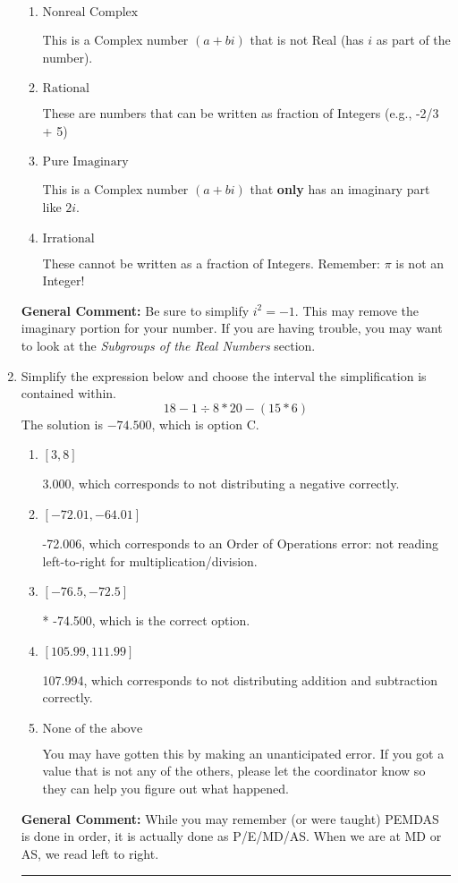 \documentclass{extbook}[14pt]
\newcommand{\litem}[1]{\item #1

\rule{\textwidth}{0.4pt}}
\begin{document}
\begin{enumerate}
{\begin{enumerate}[label=\Alph*.]
* This is the correct option!
\item \( \text{Nonreal Complex} \)

This is a Complex number $(a+bi)$ that is not Real (has $i$ as part of the number).
\item \( \text{Rational} \)

These are numbers that can be written as fraction of Integers (e.g., -2/3 + 5)
\item \( \text{Pure Imaginary} \)

This is a Complex number $(a+bi)$ that \textbf{only} has an imaginary part like $2i$.
\item \( \text{Irrational} \)

These cannot be written as a fraction of Integers. Remember: $\pi$ is not an Integer!
\end{enumerate}

\textbf{General Comment:} Be sure to simplify $i^2 = -1$. This may remove the imaginary portion for your number. If you are having trouble, you may want to look at the \textit{Subgroups of the Real Numbers} section.
}
\litem{
Simplify the expression below and choose the interval the simplification is contained within.
\[ 18 - 1 \div 8 * 20 - (15 * 6) \]The solution is \( -74.500 \), which is option C.\begin{enumerate}[label=\Alph*.]
\item \( [3, 8] \)

 3.000, which corresponds to not distributing a negative correctly.
\item \( [-72.01, -64.01] \)

 -72.006, which corresponds to an Order of Operations error: not reading left-to-right for multiplication/division.
\item \( [-76.5, -72.5] \)

* -74.500, which is the correct option.
\item \( [105.99, 111.99] \)

 107.994, which corresponds to not distributing addition and subtraction correctly.
\item \( \text{None of the above} \)

 You may have gotten this by making an unanticipated error. If you got a value that is not any of the others, please let the coordinator know so they can help you figure out what happened.
\end{enumerate}

\textbf{General Comment:} While you may remember (or were taught) PEMDAS is done in order, it is actually done as P/E/MD/AS. When we are at MD or AS, we read left to right.
}
\end{enumerate}
\end{document}
